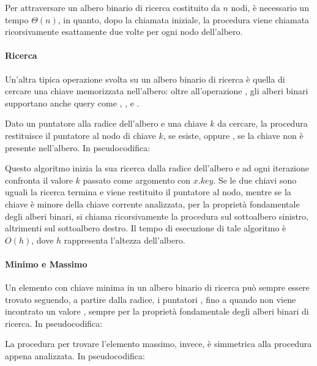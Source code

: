 

Per attraversare un albero binario di ricerca costituito da \(n\) nodi, è necessario un tempo \(\Theta(n)\), in quanto, dopo la chiamata iniziale, la procedura viene chiamata ricorsivamente esattamente due volte per ogni nodo dell'albero. 

\paragraph{Ricerca}
Un'altra tipica operazione svolta su un albero binario di ricerca è quella di cercare una chiave memorizzata nell'albero: oltre all'operazione , gli alberi binari supportano anche query come , ,  e . 

Dato un puntatore alla radice dell'albero e una chiave \(k\) da cercare, la procedura  restituisce il puntatore al nodo di chiave \(k\), se esiste, oppure , se la chiave non è presente nell'albero. In pseudocodifica:



Questo algoritmo inizia la sua ricerca dalla radice dell'albero e ad ogni iterazione confronta il valore \(k\) passato come argomento con \(x.key\). Se le due chiavi sono uguali la ricerca termina e viene restituito il puntatore al nodo, mentre se la chiave è minore della chiave corrente analizzata, per la proprietà fondamentale degli alberi binari, si chiama ricorsivamente la procedura sul sottoalbero sinistro, altrimenti sul sottoalbero destro. Il tempo di esecuzione di tale algoritmo è \(O(h)\), dove \(h\) rappresenta l'altezza dell'albero. 

\paragraph{Minimo e Massimo}
Un elemento con chiave minima in un albero binario di ricerca può sempre essere trovato seguendo, a partire dalla radice, i puntatori , fino a quando non viene incontrato un valore , sempre per la proprietà fondamentale degli alberi binari di ricerca. In pseudocodifica:



La procedura per trovare l'elemento massimo, invece, è simmetrica alla procedura appena analizzata. In pseudocodifica:


